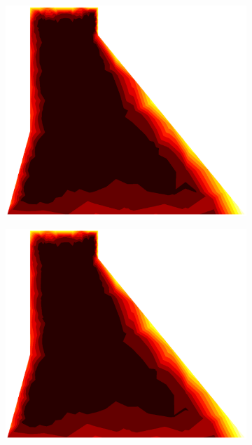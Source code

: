 \documentclass[10pt, a4paper]{article}
\begin{document}
\begin{figure}[H]
\begin{subfigure}[H]{0.19\textwidth}
		\includegraphics[width=1.2\textwidth]{fig/10.eps}
	\end{subfigure}
	\begin{subfigure}[H]{0.19\textwidth}
		\includegraphics[width=1.2\textwidth]{fig/11.eps}
	\end{subfigure}
	\begin{subfigure}[H]{0.19\textwidth}

\end{subfigure}
\end{figure}
\end{document}
